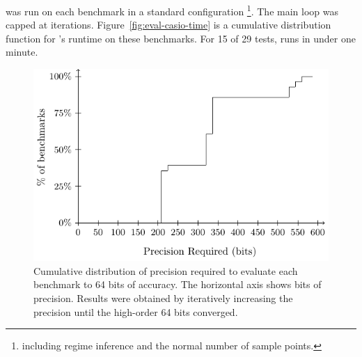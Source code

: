 \documentclass[paper.tex]{subfiles}
\begin{document}
\casio was run on each benchmark in a standard configuration%
\footnote{including regime inference and the normal number of sample
  points.}.  The main loop was capped at \nIters iterations.
Figure~\ref{fig:eval-casio-time} is a cumulative distribution function for
\casio's runtime on these benchmarks.  For 15 of 29 tests, \casio runs
in under one minute.

\begin{figure}
\includegraphics[width=0.9\columnwidth]{fig/eval-mpfr-bits.pdf}
\caption{Cumulative distribution of precision required to evaluate
  each benchmark to 64 bits of accuracy. The horizontal axis shows
  bits of precision. Results were obtained by iteratively increasing
  the precision until the high-order 64 bits converged.}
\label{fig:eval-mpfr-bits}
\end{figure}
\end{document}
